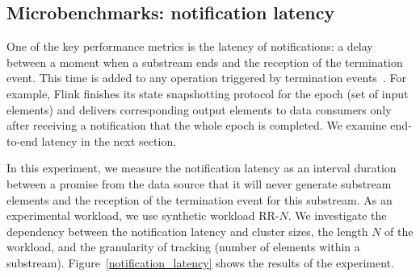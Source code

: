 \subsection{Microbenchmarks: notification latency}
\label{absolute-latency}

One of the key performance metrics is the latency of notifications: a delay between a moment when a substream ends and the reception of the termination event. This time is added to any operation triggered by termination events~\cite{Carbone:2017:SMA:3137765.3137777, we2018adbis}. For example, Flink finishes its state snapshotting protocol for the epoch (set of input elements) and delivers corresponding output elements to data consumers only after receiving a notification that the whole epoch is completed. We examine end-to-end latency in the next section.



In this experiment, we measure the notification latency as an interval duration between a promise from the data source that it will never generate substream elements and the reception of the termination event for this substream. As an experimental workload, we use synthetic workload RR-$N$. We investigate the dependency between the notification latency and cluster sizes, the length $N$ of the workload, and the granularity of tracking (number of elements within a substream). Figure~\ref{notification_latency} shows the results of the experiment. 

